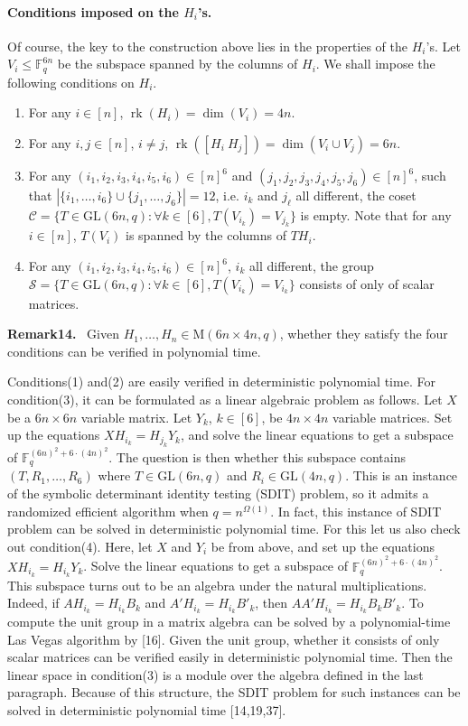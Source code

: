 \documentclass[10pt,a4paper]{article}
\newenvironment{authorclaim}[1]{\par\medskip\noindent\textbf{#1.}\ }{\par\medskip}
\begin{document}
\paragraph{Conditions imposed on the $H_i$'s.} Of course, the key to the construction above lies in the properties of the $H_i$'s. Let $V_i\le\mathbb F_q^{6n}$ be the subspace spanned by the columns of $H_i$. We shall impose the following conditions on $H_i$.
\begin{enumerate}
\item For any $i\in[n]$, $\operatorname{rk}(H_i)=\dim(V_i)=4n$.
\item For any $i,j\in[n]$, $i\ne j$, $\operatorname{rk}([H_i\ H_j])=\dim(V_i\cup V_j)=6n$.
\item For any $(i_1,i_2,i_3,i_4,i_5,i_6)\in[n]^6$ and $(j_1,j_2,j_3,j_4,j_5,j_6)\in[n]^6$, such that $|\{i_1,\ldots,i_6\}\cup\{j_1,\ldots,j_6\}|=12$, i.e. $i_k$ and $j_\ell$ all different, the coset $\mathcal C=\{T\in\mathrm{GL}(6n,q):\forall k\in[6],T(V_{i_k})=V_{j_k}\}$ is empty. Note that for any $i\in[n]$, $T(V_i)$ is spanned by the columns of $TH_i$.
\item For any $(i_1,i_2,i_3,i_4,i_5,i_6)\in[n]^6$, $i_k$ all different, the group $\mathcal S=\{T\in\mathrm{GL}(6n,q):\forall k\in[6],T(V_{i_k})=V_{i_k}\}$ consists of only of scalar matrices.
\end{enumerate}
\begin{authorclaim}{Remark14}
Given $H_1,\ldots,H_n\in\mathrm M(6n\times4n,q)$, whether they satisfy the four conditions can be verified in polynomial time.
\end{authorclaim}
Conditions(1) and(2) are easily verified in deterministic polynomial time.
For condition(3), it can be formulated as a linear algebraic problem as follows. Let $X$ be a $6n\times6n$ variable matrix. Let $Y_k$, $k\in[6]$, be $4n\times4n$ variable matrices. Set up the equations $XH_{i_k}=H_{j_k}Y_k$, and solve the linear equations to get a subspace of $\mathbb F_q^{(6n)^2+6\cdot(4n)^2}$. The question is then whether this subspace contains $(T,R_1,\ldots,R_6)$ where $T\in\mathrm{GL}(6n,q)$ and $R_i\in\mathrm{GL}(4n,q)$. This is an instance of the symbolic determinant identity testing (SDIT) problem, so it admits a randomized efficient algorithm when $q=n^{\Omega(1)}$.
In fact, this instance of SDIT problem can be solved in deterministic polynomial time. For this let us also check out condition(4). Here, let $X$ and $Y_i$ be from above, and set up the equations $XH_{i_k}=H_{i_k}Y_k$. Solve the linear equations to get a subspace of $\mathbb F_q^{(6n)^2+6\cdot(4n)^2}$. This subspace turns out to be an algebra under the natural multiplications. Indeed, if $AH_{i_k}=H_{i_k}B_k$ and $A'H_{i_k}=H_{i_k}B'_k$, then $AA'H_{i_k}=H_{i_k}B_kB'_k$. To compute the unit group in a matrix algebra can be solved by a polynomial-time Las Vegas algorithm by [16]. Given the unit group, whether it consists of only scalar matrices can be verified easily in deterministic polynomial time.
Then the linear space in condition(3) is a module over the algebra defined in the last paragraph. Because of this structure, the SDIT problem for such instances can be solved in deterministic polynomial time [14,19,37].
\end{document}
